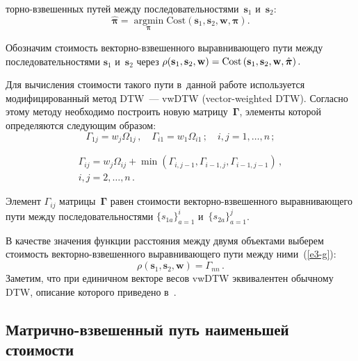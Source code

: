 \begin{multicols}{2}
\columnbreak

\noindent
тор\-но-взве\-шен\-ных путей между 
последовательностями~$\mathbf{s}_1$ и~$\mathbf{s}_2$:
\begin{equation}
\hat{\boldsymbol{\pi}} = 
\mathop{\mathrm{argmin}}\limits_{{\boldsymbol{\pi}}} \mathrm{Cost}
\left(\mathbf{s}_1,\mathbf{s}_2,\mathbf{w},\boldsymbol{\pi}\right).
\label{e3-g}
\end{equation}

Обозначим стоимость век\-тор\-но-взве\-шен\-но\-го выравнивающего пути между 
последовательностями $\mathbf{s}_1$ и~$\mathbf{s}_2$ через 
$\rho(\mathbf{s}_1,\mathbf{s}_2,\mathbf{w}) \hm= \mathrm{Cost}
\left(\mathbf{s}_1,\mathbf{s}_2,\mathbf{w},\hat{\boldsymbol{\pi}}\right).$

Для вычисления стоимости такого пути в~данной работе используется модифицированный 
метод DTW~--- vwDTW (vector-weighted DTW). Согласно этому методу необходимо 
построить новую матрицу~$\boldsymbol{\Gamma}$, элементы которой определяются 
следующим образом:
\begin{equation*}
\Gamma_{1j} = w_j\Omega_{1j}\,,\quad 
\Gamma_{i1} = w_1\Omega_{i1}\,;\quad 
i,j = 1, \dots , n\,;
\end{equation*}

\vspace*{-12pt}

\noindent
\begin{multline*}
\Gamma_{ij} = w_j\Omega_{ij}+\min\left(\Gamma_{i,j-1},\Gamma_{i-1,j},\Gamma_{i-1,j-1}
\right)\,,\\
  i,j = 2 , \dots , n\,.
\end{multline*}

Элемент $\Gamma_{ij}$ матрицы~$\boldsymbol{\Gamma}$ равен стоимости 
век\-тор\-но-взве\-шен\-но\-го выравнивающего пути между 
последовательностями $\{{s}_{1a}\}_{a=1}^i$ и~$\{{s}_{2a}\}_{a=1}^j$.

В качестве значения функции расстояния между двумя объектами 
выберем стоимость век\-тор\-но-взве\-шен\-но\-го выравнивающего пути между ними~(\ref{e3-g}):
\begin{equation}
\rho(\mathbf{s}_1,\mathbf{s}_2,\mathbf{w})= \Gamma_{nn}\,.
\label{e4-g}
\end{equation}
Заметим, что при единичном векторе весов vwDTW эквивалентен обычному DTW, 
описание которого приведено в~\cite{Goncharov}.

\subsection{Матрично-взвешенный путь наименьшей стоимости}


\end{multicols}
